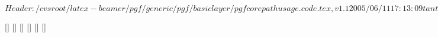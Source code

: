 \ProvidesFileRCS $Header: /cvsroot/latex-beamer/pgf/generic/pgf/basiclayer/pgfcorepathusage.code.tex,v 1.1 2005/06/11 17:13:09 tantau Exp $

%


%
%
%

[]{\def\pgf@up@stroke{stroke}}
[]{\def\pgf@up@stroke{stroke}}
[]{\def\pgf@up@fill{fill}}
[]{\def\pgf@up@clip{clip}}
[]{}
[]{\def\pgf@up@bb{\pgf@relevantforpicturesizefalse}}

\def\pgfusepath#1{%
  \let\pgf@up@stroke\@empty%
  \let\pgf@up@fill\@empty%
  \let\pgf@up@clip\@empty%
  \let\pgf@up@discard\@empty%
  \let\pgf@up@bb\@empty%
  \setkeys{pgfup}{#1}%
  \expandafter\def\expandafter\pgf@up@action\expandafter{\csname pgfsys@\pgf@up@fill\pgf@up@stroke\endcsname}%
  \ifx\pgf@up@stroke\@empty%
    \ifx\pgf@up@fill\@empty%
      \ifx\pgf@up@clip\@empty%
        \let\pgf@up@action=\@empty%
        \pgfsyssoftpath@setcurrentpath\@empty%
      \else%
        \let\pgf@up@action=\pgfsys@discardpath%
      \fi%
    \fi%
  \fi%
  \pgfprocessround{\pgfsyssoftpath@currentpath}{\pgfsyssoftpath@currentpath}%
  \ifx\pgf@up@clip\@empty%
    \ifx\pgf@up@stroke\@empty%
      \pgfsyssoftpath@invokecurrentpath%
      \pgfsyssoftpath@getcurrentpath\pgf@last@used@path%
      \pgf@up@action%
    \else%
      \pgf@check@for@arrows%
      \ifpgf@drawarrows%
        \pgf@shorten@path@as@needed%
        \pgfsyssoftpath@invokecurrentpath%
        \pgfsyssoftpath@getcurrentpath\pgf@last@used@path%
        \pgf@up@action%
        \pgfsyssoftpath@setcurrentpath\@empty%
        \pgf@add@arrows@as@needed%
      \else%
        \pgfsyssoftpath@invokecurrentpath%
        \pgfsyssoftpath@getcurrentpath\pgf@last@used@path%
        \pgf@up@action%
      \fi%
    \fi%
  \else%
    \pgfsyssoftpath@invokecurrentpath%
    \pgfsyssoftpath@getcurrentpath\pgf@last@used@path%
    \pgfsys@clipnext%
    \pgf@up@action%
    \pgf@relevantforpicturesizefalse%
  \fi%
  \pgf@up@bb%
  \pgfsyssoftpath@setcurrentpath\@empty%
  \pgf@resetpathsizes%
  \ignorespaces%
}


